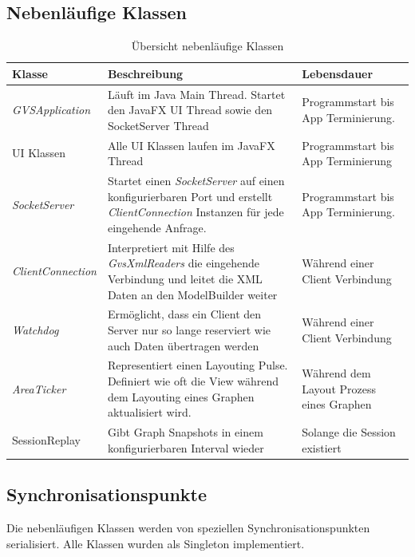 \documentclass[11pt,a4paper,english,oneside]{book}
\numberwithin{equation}{chapter}
\begin{document}
	\subsection{Nebenläufige Klassen}
	
	\begin{table}[h!]
		\centering
		\begin{tabularx}{\linewidth}{l X X}
			\toprule 
			Klasse & Beschreibung & Lebensdauer \\
			\midrule
			\textit{GVSApplication} & Läuft im Java Main Thread. Startet den JavaFX UI Thread sowie den SocketServer Thread & Programmstart bis App Terminierung. \\
			UI Klassen & Alle UI Klassen laufen im JavaFX Thread & Programmstart bis App Terminierung \\
			\textit{SocketServer} & Startet einen \textit{SocketServer} auf einen konfigurierbaren Port und erstellt \textit{ClientConnection} Instanzen für jede eingehende Anfrage. & Programmstart bis App Terminierung. \\
			\textit{ClientConnection} & Interpretiert mit Hilfe des \textit{GvsXmlReaders} die eingehende Verbindung und leitet die XML Daten an den ModelBuilder weiter & Während einer Client Verbindung \\
			\textit{Watchdog} & Ermöglicht, dass ein Client den Server nur so lange reserviert wie auch Daten übertragen werden & Während einer Client Verbindung \\
			\textit{AreaTicker} & Representiert einen Layouting Pulse. Definiert wie oft die View während dem Layouting eines Graphen aktualisiert wird. & Während dem Layout Prozess eines Graphen \\
			SessionReplay & Gibt Graph Snapshots in einem konfigurierbaren Interval wieder & Solange die Session existiert \\
			\bottomrule 
		\end{tabularx} 
		\caption{Übersicht nebenläufige Klassen} 
	\end{table}

	\subsection{Synchronisationspunkte}
	
	Die nebenläufigen Klassen werden von speziellen Synchronisationspunkten serialisiert. Alle Klassen wurden als Singleton implementiert.
	
\end{document}
